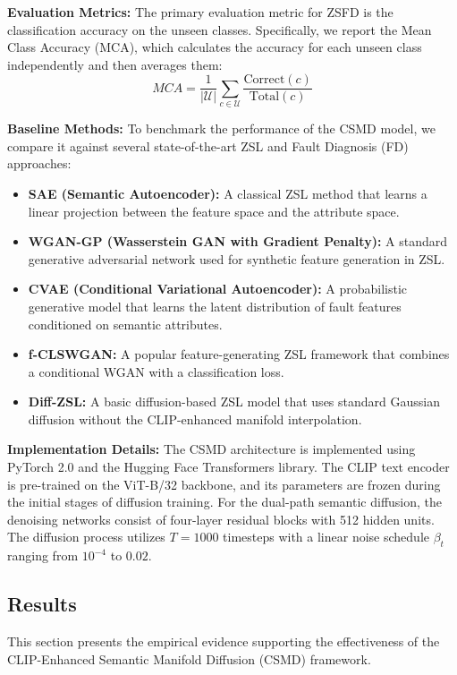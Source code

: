 \documentclass[journal,12pt,onecolumn]{IEEEtran}
\begin{document}
\textbf{Evaluation Metrics:}
The primary evaluation metric for ZSFD is the classification accuracy on the unseen classes. Specifically, we report the Mean Class Accuracy (MCA), which calculates the accuracy for each unseen class independently and then averages them:
\begin{equation}
    MCA = \frac{1}{|\mathcal{U}|} \sum_{c \in \mathcal{U}} \frac{\text{Correct}(c)}{\text{Total}(c)}
\end{equation}

\textbf{Baseline Methods:}
To benchmark the performance of the CSMD model, we compare it against several state-of-the-art ZSL and Fault Diagnosis (FD) approaches:
\begin{itemize}
    \item \textbf{SAE (Semantic Autoencoder):} A classical ZSL method that learns a linear projection between the feature space and the attribute space.
    \item \textbf{WGAN-GP (Wasserstein GAN with Gradient Penalty):} A standard generative adversarial network used for synthetic feature generation in ZSL.
    \item \textbf{CVAE (Conditional Variational Autoencoder):} A probabilistic generative model that learns the latent distribution of fault features conditioned on semantic attributes.
    \item \textbf{f-CLSWGAN:} A popular feature-generating ZSL framework that combines a conditional WGAN with a classification loss.
    \item \textbf{Diff-ZSL:} A basic diffusion-based ZSL model that uses standard Gaussian diffusion without the CLIP-enhanced manifold interpolation.
\end{itemize}

\textbf{Implementation Details:}
The CSMD architecture is implemented using PyTorch 2.0 and the Hugging Face Transformers library. The CLIP text encoder is pre-trained on the ViT-B/32 backbone, and its parameters are frozen during the initial stages of diffusion training. For the dual-path semantic diffusion, the denoising networks consist of four-layer residual blocks with 512 hidden units. The diffusion process utilizes $T=1000$ timesteps with a linear noise schedule $\beta_t$ ranging from $10^{-4}$ to $0.02$.

\subsection{Results}
This section presents the empirical evidence supporting the effectiveness of the CLIP-Enhanced Semantic Manifold Diffusion (CSMD) framework.
\end{document}
